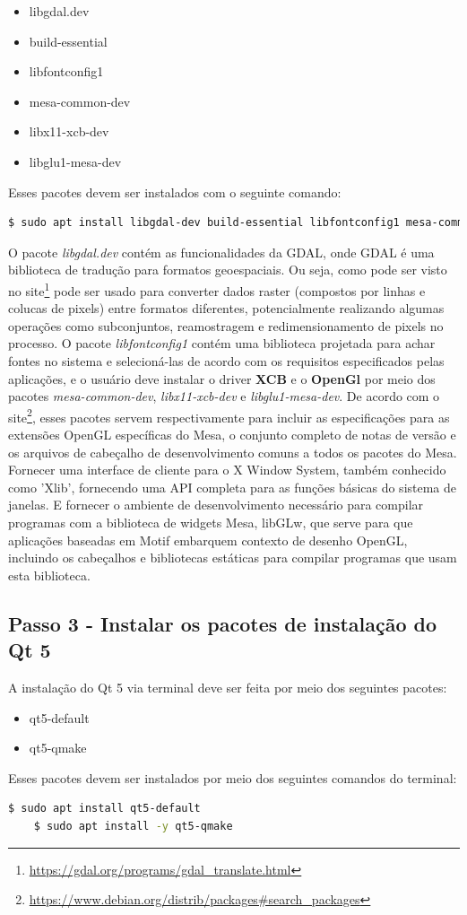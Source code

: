 \begin{itemize}
   	\item libgdal.dev
   	\item build-essential
   	\item libfontconfig1
   	\item mesa-common-dev
   	\item libx11-xcb-dev
   	\item libglu1-mesa-dev
\end{itemize}
Esses pacotes devem ser instalados com o seguinte comando: 
\begin{lstlisting}[language=bash]
	$ sudo apt install libgdal-dev build-essential libfontconfig1 mesa-common-dev libx11-xcb-dev libglu1-mesa-dev
\end{lstlisting}				
	
O pacote \textit{libgdal.dev} contém as funcionalidades da GDAL, onde GDAL é uma biblioteca de tradução para formatos geoespaciais. Ou seja, como pode ser visto no site\footnote{\url{https://gdal.org/programs/gdal_translate.html}} pode ser usado para converter dados raster (compostos por linhas e colucas de pixels) entre formatos diferentes, potencialmente realizando algumas operações como subconjuntos, reamostragem e redimensionamento de pixels no processo.
O pacote \textit{libfontconfig1} contém uma biblioteca projetada para achar fontes no sistema e selecioná-las de acordo com os requisitos especificados pelas aplicações, e o usuário deve instalar o driver \textbf{XCB} e o \textbf{OpenGl} por meio dos pacotes \textit{mesa-common-dev}, \textit{libx11-xcb-dev} e \textit{libglu1-mesa-dev}. De acordo com o site\footnote{\url{https://www.debian.org/distrib/packages\#search\_packages}}, esses pacotes servem respectivamente para incluir as especificações para as extensões OpenGL específicas do Mesa, o conjunto completo de notas de versão e os arquivos de cabeçalho de desenvolvimento comuns a todos os pacotes do Mesa. Fornecer uma interface de cliente para o X Window System, também conhecido como 'Xlib', fornecendo uma API completa para as funções básicas do sistema de janelas. E fornecer o ambiente de desenvolvimento necessário para compilar programas com a biblioteca de widgets Mesa, libGLw, que serve para que aplicações baseadas em Motif embarquem contexto de desenho OpenGL, incluindo os cabeçalhos e bibliotecas estáticas para compilar programas que usam esta biblioteca.
  
\subsection{Passo 3 - Instalar os pacotes de instalação do Qt 5}   
A instalação do Qt 5 via terminal deve ser feita por meio dos seguintes pacotes:
\begin{itemize}
	\item qt5-default
	\item qt5-qmake
\end{itemize}   
Esses pacotes devem ser instalados por meio dos seguintes comandos do terminal:
\begin{lstlisting}[language=bash]
	$ sudo apt install qt5-default
	$ sudo apt install -y qt5-qmake
\end{lstlisting}	
    
